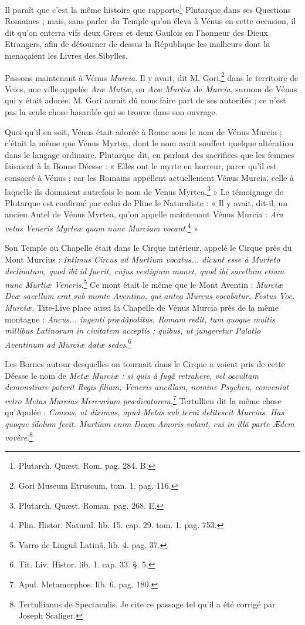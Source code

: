 \documentclass[a4paper, 11pt, oneside, polutonikogreek, french]{article}
\begin{document}
Il paraît que c'est la même histoire que rapporte\footnote{Plutarch. Quæst. Rom. pag. 284. B.} Plutarque dans ses Questions Romaines ; mais, sans parler du Temple qu'on éleva à Vénus en cette occasion, il dit qu'on enterra vifs deux Grecs et deux Gaulois en l'honneur des Dieux Etrangers, afin de détourner de dessus la République les malheurs dont la menaçaient les Livres des Sibylles.

Passons maintenant à Vénus \emph{Murcia}. Il y avait, dit M. Gori,\footnote{Gori Museum Etruscum, tom. 1. pag. 116.} dans le territoire de Veies, une ville appelée \emph{Aræ Mutiæ}, ou \emph{Aræ Murtiæ} de \emph{Murcia}, surnom de Vénus qui y était adorée. M. Gori aurait dû nous faire part de ses autorités ; ce n'est pas la seule chose hasardée qui se trouve dans son ouvrage.

Quoi qu'il en soit, Vénus était adorée à Rome sous le nom de Vénus Murcia ; c'était la même que Vénus Myrtea, dont le nom avait souffert quelque altération dans le langage ordinaire. Plutarque dit, en parlant des sacrifices que les femmes faisaient à la Bonne Déesse : « Elles ont le myrte en horreur, parce qu'il est consacré à Vénus ; car les Romains appellent actuellement Vénus Murcia, celle à laquelle ils donnaient autrefois le nom de Venus Myrtea.\footnote{Plutarch. Quæst. Roman. pag. 268. E.} » Le témoignage de Plutarque est confirmé par celui de Pline le Naturaliste : « Il y avait, dit-il, un ancien Autel de Vénus Myrtea, qu'on appelle maintenant Vénus Murcia : \emph{Ara vetus Veneris Myrteæ quam nunc Murciam vocant}.\footnote{Plin. Histor. Natural. lib. 15. cap. 29. tom. 1. pag. 753.} »

Son Temple ou Chapelle était dans le Cirque intérieur, appelé le Cirque près du Mont Murcius : \emph{Intimus Circus ad Murtium vocatus... dicunt esse à Murteto declinatum, quod ibi id fuerit, cujus vestigium manet, quod ibi sacellum etiam nunc Murtiæ Veneris}.\footnote{Varro de Linguâ Latinâ, lib. 4. pag. 37.} Ce mont était le même que le Mont Aventin : \emph{Murciæ Deæ sacellum erat sub monte Aventino, qui antea Murcus vocabatur. Festus Voc. Murciæ.} Tite-Live place aussi la Chapelle de Vénus Murcia près de la même montagne : \emph{Ancus... ingenti prædâpotitus, Romam redit, tum quoque multis millibus Latinorum in civitatem acceptis ; quibus, ut jungeretur Palatio Aventinum ad Murciæ datæ sedes}.\footnote{Tit. Liv. Histor. lib. 1. cap. 33. §. 5.}

Les Bornes autour desquelles on tournait dans le Cirque a voient pris de cette Déesse le nom de \emph{Metæ Murciæ : si quis â fugâ retrahere, vel occultam demonstrare poterit Regis filiam, Veneris ancillam, nomine Psychen, conveniat retro Metas Murcias Mercurium prædicatorem}.\footnote{Apul. Metamorphos. lib. 6. pag. 180.} Tertullien dit la même chose qu'Apulée : \emph{Consus, ut diximus, apud Metas sub terrâ delitescit Murcias. Has quoque idolum fecit. Murtiam enim Deam Amoris volant, cui in illâ parte Ædem vovêre}.\footnote{Tertullianus de Spectaculis. Je cite ce passage tel qu'il a été corrigé par Joseph Scaliger.}
\end{document}

